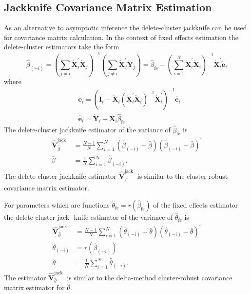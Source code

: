 \documentclass[10pt]{article}
\begin{document}
\subsection{Jackknife Covariance Matrix Estimation}
As an alternative to asymptotic inference the delete-cluster jackknife can be used for covariance matrix calculation. In the context of fixed effects estimation the delete-cluster estimators take the form
$$
\widehat{\beta}_{(-i)}=\left(\sum_{j \neq i} \dot{\boldsymbol{X}}_{j}^{\prime} \dot{\boldsymbol{X}}_{j}\right)^{-1}\left(\sum_{j \neq i} \dot{\boldsymbol{X}}_{j}^{\prime} \dot{\boldsymbol{Y}}_{j}\right)=\widehat{\beta}_{\mathrm{fe}}-\left(\sum_{i=1}^{N} \dot{\boldsymbol{X}}_{i}^{\prime} \dot{\boldsymbol{X}}_{i}\right)^{-1} \dot{\boldsymbol{X}}_{i}^{\prime} \widetilde{\boldsymbol{e}}_{i}
$$
where
$$
\begin{aligned}
&\widetilde{\boldsymbol{e}}_{i}=\left(\boldsymbol{I}_{i}-\dot{\boldsymbol{X}}_{i}\left(\dot{\boldsymbol{X}}_{i}^{\prime} \dot{\boldsymbol{X}}_{i}\right)^{-1} \dot{\boldsymbol{X}}_{i}^{\prime}\right)^{-1} \widehat{\boldsymbol{e}}_{i} \\
&\widehat{\boldsymbol{e}}_{i}=\dot{\boldsymbol{Y}}_{i}-\dot{\boldsymbol{X}}_{i} \widehat{\beta}_{\mathrm{fe}}
\end{aligned}
$$
The delete-cluster jackknife estimator of the variance of $\widehat{\beta}_{\mathrm{fe}}$ is
$$
\begin{aligned}
\widehat{\boldsymbol{V}}_{\widehat{\beta}}^{\text {jack }} &=\frac{N-1}{N} \sum_{i=1}^{N}\left(\widehat{\beta}_{(-i)}-\bar{\beta}\right)\left(\widehat{\beta}_{(-i)}-\bar{\beta}\right)^{\prime} \\
\bar{\beta} &=\frac{1}{N} \sum_{i=1}^{N} \widehat{\beta}_{(-i)} .
\end{aligned}
$$
The delete-cluster jackknife estimator $\widehat{\boldsymbol{V}}_{\widehat{\beta}}^{\text {jack }}$ is similar to the cluster-robust covariance matrix estimator.

For parameters which are functions $\widehat{\theta}_{\mathrm{fe}}=r\left(\widehat{\beta}_{\mathrm{fe}}\right)$ of the fixed effects estimator the delete-cluster jack- knife estimator of the variance of $\widehat{\theta}_{\mathrm{fe}}$ is
$$
\begin{aligned}
\widehat{\boldsymbol{V}}_{\widehat{\theta}}^{\mathrm{jack}} &=\frac{N-1}{N} \sum_{i=1}^{N}\left(\widehat{\theta}_{(-i)}-\bar{\theta}\right)\left(\widehat{\theta}_{(-i)}-\bar{\theta}\right)^{\prime} \\
\widehat{\theta}_{(-i)} &=r\left(\widehat{\beta}_{(-i)}\right) \\
\bar{\theta} &=\frac{1}{N} \sum_{i=1}^{N} \widehat{\theta}_{(-i)} .
\end{aligned}
$$
The estimator $\widehat{\boldsymbol{V}}_{\widehat{\theta}}^{\text {jack }}$ is similar to the delta-method cluster-robust covariance matrix estimator for $\widehat{\theta}$.
\end{document}
